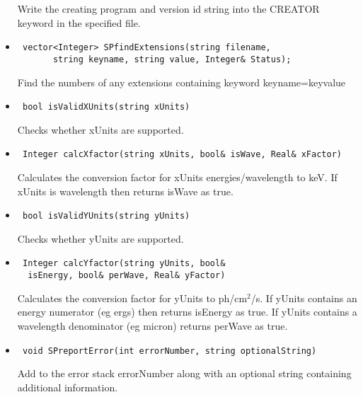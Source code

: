 \documentclass[11pt]{book}
\begin{document}
\begin{itemize}
          Write the creating program and version id string into the
          CREATOR keyword in the specified file.

\item  \begin{verbatim} vector<Integer> SPfindExtensions(string filename, 
       string keyname, string value, Integer& Status); \end{verbatim}

          Find the numbers of any extensions containing keyword 
          keyname=keyvalue

\item  \begin{verbatim} bool isValidXUnits(string xUnits) \end{verbatim}

          Checks whether xUnits are supported.

\item  \begin{verbatim} Integer calcXfactor(string xUnits, bool& isWave, Real& xFactor) \end{verbatim}

          Calculates the conversion factor for xUnits
          energies/wavelength to keV. If xUnits is wavelength then
          returns isWave as true.

\item  \begin{verbatim} bool isValidYUnits(string yUnits) \end{verbatim}

          Checks whether yUnits are supported.

\item  \begin{verbatim} Integer calcYfactor(string yUnits, bool&
  isEnergy, bool& perWave, Real& yFactor) \end{verbatim}

          Calculates the conversion factor for yUnits to ph/cm$^2$/s.
          If yUnits contains an energy numerator (eg ergs) then
          returns isEnergy as true. If yUnits contains a wavelength
          denominator (eg micron) returns perWave as true.

\item  \begin{verbatim} void SPreportError(int errorNumber, string optionalString) \end{verbatim}

          Add to the error stack errorNumber along with an optional
          string containing additional information.


\end{itemize}
\end{document}
